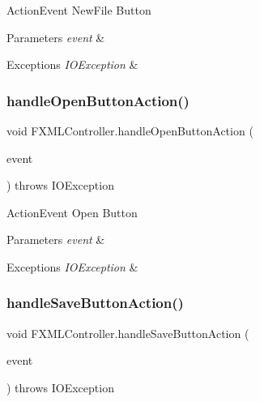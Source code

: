 Action\+Event New\+File Button 
\begin{DoxyParams}{Parameters}
{\em event} & \\
\hline
\end{DoxyParams}

\begin{DoxyExceptions}{Exceptions}
{\em I\+O\+Exception} & \\
\hline
\end{DoxyExceptions}
\mbox{\label{class_f_x_m_l_controller_a9732d827f72b5b6551fbbe7c83e78a0a}} 
\subsubsection{\texorpdfstring{handle\+Open\+Button\+Action()}{handleOpenButtonAction()}}
{\footnotesize\ttfamily void F\+X\+M\+L\+Controller.\+handle\+Open\+Button\+Action (\begin{DoxyParamCaption}\item[{Action\+Event}]{event }\end{DoxyParamCaption}) throws I\+O\+Exception\hspace{0.3cm}{\ttfamily [protected]}}

Action\+Event Open Button 
\begin{DoxyParams}{Parameters}
{\em event} & \\
\hline
\end{DoxyParams}

\begin{DoxyExceptions}{Exceptions}
{\em I\+O\+Exception} & \\
\hline
\end{DoxyExceptions}
\mbox{\label{class_f_x_m_l_controller_a533446d86df0c4a1db758543d175c357}} 
\subsubsection{\texorpdfstring{handle\+Save\+Button\+Action()}{handleSaveButtonAction()}}
{\footnotesize\ttfamily void F\+X\+M\+L\+Controller.\+handle\+Save\+Button\+Action (\begin{DoxyParamCaption}\item[{Action\+Event}]{event }\end{DoxyParamCaption}) throws I\+O\+Exception\hspace{0.3cm}{\ttfamily [protected]}}

